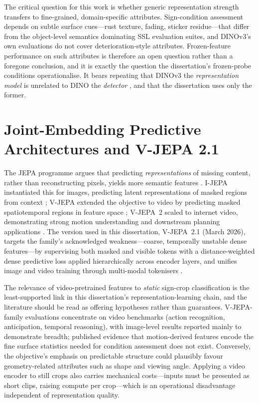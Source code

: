 The critical question for this work is whether generic representation strength transfers to fine-grained, domain-specific attributes. Sign-condition assessment depends on subtle surface cues---rust texture, fading, sticker residue---that differ from the object-level semantics dominating SSL evaluation suites, and DINOv3's own evaluations do not cover deterioration-style attributes. Frozen-feature performance on such attributes is therefore an open question rather than a foregone conclusion, and it is exactly the question the dissertation's frozen-probe conditions operationalise. It bears repeating that DINOv3 the \emph{representation model} is unrelated to DINO the \emph{detector} \citep{zhang2023dino}, and that the dissertation uses only the former.

\section{Joint-Embedding Predictive Architectures and V-JEPA 2.1}
\label{sec:lr-vjepa}

The JEPA programme argues that predicting \emph{representations} of missing content, rather than reconstructing pixels, yields more semantic features \citep{lecun2022path}. I-JEPA instantiated this for images, predicting latent representations of masked regions from context \citep{assran2023self}; V-JEPA extended the objective to video by predicting masked spatiotemporal regions in feature space \citep{bardes2024revisiting}; V-JEPA~2 scaled to internet video, demonstrating strong motion understanding and downstream planning applications \citep{assran2025vjepa2}. The version used in this dissertation, V-JEPA~2.1 (March 2026), targets the family's acknowledged weakness---coarse, temporally unstable dense features---by supervising both masked and visible tokens with a distance-weighted dense predictive loss applied hierarchically across encoder layers, and unifies image and video training through multi-modal tokenisers \citep{murlabadia2026vjepa21}.

The relevance of video-pretrained features to \emph{static} sign-crop classification is the least-supported link in this dissertation's representation-learning chain, and the literature should be read as offering hypotheses rather than guarantees. V-JEPA-family evaluations concentrate on video benchmarks (action recognition, anticipation, temporal reasoning), with image-level results reported mainly to demonstrate breadth; published evidence that motion-derived features encode the fine surface statistics needed for condition assessment does not exist. Conversely, the objective's emphasis on predictable structure could plausibly favour geometry-related attributes such as shape and viewing angle. Applying a video encoder to still crops also carries mechanical costs---inputs must be presented as short clips, raising compute per crop---which is an operational disadvantage independent of representation quality.

